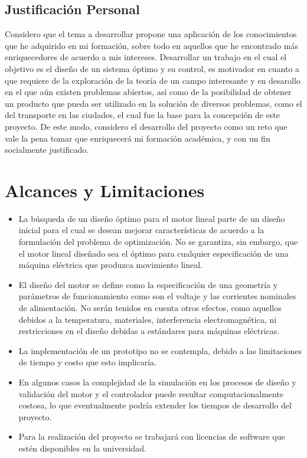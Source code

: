 \subsection{Justificación Personal}

Considero que el tema a desarrollar propone una aplicación de los conocimientos que he adquirido en mi formación, sobre todo en aquellos que he encontrado más enriquecedores de acuerdo a mis intereses. Desarrollar un trabajo en el cual el objetivo es el diseño de un sistema óptimo y su control, es motivador en cuanto a que requiere de la exploración de la teoría de un campo interesante y en desarollo en el que aún existen problemas abiertos, así como de la posibilidad de obtener un producto que pueda ser utilizado en la solución de diversos problemas, como el del transporte en las ciudades, el cual fue la base para la concepción de este proyecto. De este modo, considero el desarrollo del proyecto como un reto que vale la pena tomar que enriquecerá mi formación académica, y con un fin socialmente justificado.

\section{Alcances y Limitaciones}

\begin{itemize}
  \item La búsqueda de un diseño óptimo para el motor lineal parte de un diseño inicial para el cual se desean mejorar características de acuerdo a la formulación del problema de optimización. No se garantiza, sin embargo, que el motor lineal diseñado sea el óptimo para cualquier especificación de una máquina eléctrica que produzca movimiento lineal.
  \item El diseño del motor se define como la especificación de una geometría y parámetros de funcionamiento como son el voltaje y las corrientes nominales de alimentación. No serán tenidos en cuenta otros efectos, como aquellos debidos a la temperatura, materiales, interferencia electromagnética, ni restricciones en el diseño debidas a estándares para máquinas eléctricas.
  \item La implementación de un prototipo no se contempla, debido a las limitaciones de tiempo y costo que esto implicaría.
  \item En algunos casos la complejidad de la simulación en los procesos de diseño y validación del motor y el controlador puede resultar computacionalmente costosa, lo que eventualmente podría extender los tiempos de desarrollo del proyecto.
  \item Para la realización del proyecto se trabajará con licencias de software que estén disponibles en la universidad.
\end{itemize}